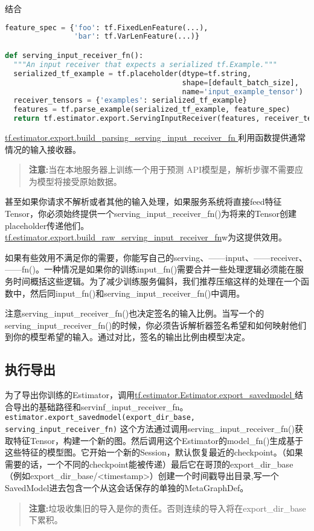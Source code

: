 结合
\begin{lstlisting}[language=Python]
feature_spec = {'foo': tf.FixedLenFeature(...),
                'bar': tf.VarLenFeature(...)}

def serving_input_receiver_fn():
  """An input receiver that expects a serialized tf.Example."""
  serialized_tf_example = tf.placeholder(dtype=tf.string,
                                         shape=[default_batch_size],
                                         name='input_example_tensor')
  receiver_tensors = {'examples': serialized_tf_example}
  features = tf.parse_example(serialized_tf_example, feature_spec)
  return tf.estimator.export.ServingInputReceiver(features, receiver_tensors)
\end{lstlisting}
\href{https://www.tensorflow.org/api_docs/python/tf/estimator/export/build_parsing_serving_input_receiver_fn?hl=zh-cn}{tf.estimator.export.build\_parsing\_serving\_input\_receiver\_fn }利用函数提供通常情况的输入接收器。
\begin{quote}
\textbf{注意:}当在本地服务器上训练一个用于预测 API模型是，解析步骤不需要应为模型将接受原始数据。
\end{quote}
甚至如果你请求不解析或者其他的输入处理，如果服务系统将直接feed特征Tensor，你必须始终提供一个serving\_input\_receiver\_fn()为将来的Tensor创建placeholder传递他们。\href{https://www.tensorflow.org/api_docs/python/tf/estimator/export/build_raw_serving_input_receiver_fn?hl=zh-cn}{tf.estimator.export.build\_raw\_serving\_input\_receiver\_fn}w为这提供效用。

如果有些效用不满足你的需要，你能写自己的serving、——input、——receiver、——fn()。一种情况是如果你的训练input\_fn()需要合并一些处理逻辑必须能在服务时间概括这些逻辑。为了减少训练服务偏斜，我们推荐压缩这样的处理在一个函数中，然后同input\_fn()和serving\_input\_receiver\_fn()中调用。

注意serving\_input\_receiver\_fn()也决定签名的输入比例。当写一个的serving\_input\_receiver\_fn()的时候，你必须告诉解析器签名希望和如何映射他们到你的模型希望的输入。通过对比，签名的输出比例由模型决定。
\subsection{执行导出}
为了导出你训练的Estimator，调用\href{https://www.tensorflow.org/api_docs/python/tf/estimator/Estimator?hl=zh-cn#export_savedmodel}{tf.estimator.Estimator.export\_savedmodel }结合导出的基础路径和servinf\_input\_receiver\_fn。
\lstinline[language=Python]{estimator.export_savedmodel(export_dir_base, serving_input_receiver_fn)}
这个方法通过调用serving\_input\_receiver\_fn()获取特征Tensor，构建一个新的图。然后调用这个Estimator的model\_fn()生成基于这些特征的模型图。它开始一个新的Session，默认恢复最近的checkpoint。（如果需要的话，一个不同的checkpoint能被传递）最后它在哥顶的export\_dir\_base（例如export\_dir\_base/<timestamp>）创建一个时间戳导出目录,写一个SavedModel进去包含一个从这会话保存的单独的MetaGraphDef。
\begin{quote}
\textbf{注意:}垃圾收集旧的导入是你的责任。否则连续的导入将在export\_dir\_base下累积。
\end{quote}
